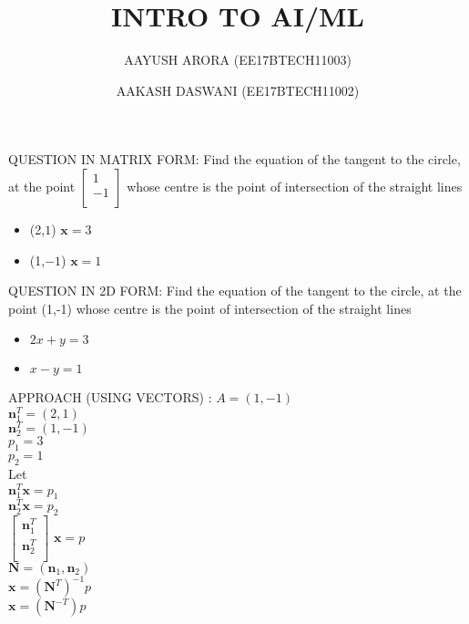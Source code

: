 \documentclass{beamer}
\title{INTRO TO AI/ML}
\author{AAYUSH ARORA (EE17BTECH11003) \and AAKASH DASWANI (EE17BTECH11002) }
\begin{document}
\maketitle
\begin{frame}{QUESTION IN MATRIX FORM:}
Find the equation of the tangent to the circle,
at the point
$\begin{bmatrix}
1\\
-1\\
\end{bmatrix}$
whose centre is the point of intersection of the
straight lines
\newline
\begin{itemize}
\item (2,$1$) $\textbf{x} =  3$
\item (1,$-1$) $\textbf{x} =  1$
\end{itemize}

\end{frame}
\begin{frame}{QUESTION IN 2D FORM:}
Find the equation of the tangent to the circle,
at the point (1,-1) whose centre is the point of intersection of the
straight lines
\newline
\begin{itemize}
\item $2x+y=3$
\item $x-y=1$
\end{itemize}

\end{frame}

\begin{frame}{APPROACH (USING VECTORS) :}
$A = (1,-1)$\\
$\textbf{n}_1^{T} = (2,1)$\\
$\textbf{n}_2^{T} =  (1,-1)$\\
$p_1 = 3$\\
$p_2=1$\\

Let \\
$\textbf{n}_1^{T}  \textbf{x} = p_1$\\
$\textbf{n}_2^{T}  \textbf{x} = p_2$\\
$\begin{bmatrix}
\textbf{n}_1^{T}\\
\textbf{n}_2^{T}\\
\end{bmatrix}$
$\textbf{x} = p $\\
$\textbf{N} = (\textbf{n}_1,\textbf{n}_2)$\\
$\textbf{x} = (\textbf{N}^{T})^{-1} p $\\
$\textbf{x} = (\textbf{N}^{-T}) p$
\end{frame}
\end{document}
